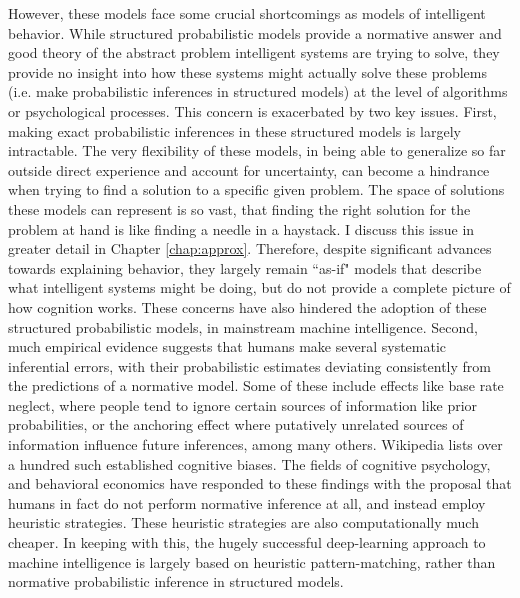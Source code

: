 However, these models face some crucial shortcomings as models of intelligent behavior. 
While structured probabilistic models provide a normative answer and good theory of the abstract problem intelligent systems are trying to solve, they provide no insight into how these systems might actually solve these problems (i.e. make probabilistic inferences in structured models) at the level of algorithms or psychological processes. %
This concern is exacerbated by two key issues. First, making exact probabilistic inferences in these structured models is largely intractable. The very flexibility of these models, in being able to generalize so far outside direct experience and account for uncertainty, can become a hindrance when trying to find a solution to a specific given problem. The space of solutions these models can represent is so vast, that finding the right solution for the problem at hand is like finding a needle in a haystack. I discuss this issue in greater detail in Chapter \ref{chap:approx}. Therefore, despite significant advances towards explaining behavior, they largely remain ``as-if" models that describe what intelligent systems might be doing, but do not provide a complete picture of how cognition works. These concerns have also hindered the adoption of these structured probabilistic models, in mainstream machine intelligence. Second, much empirical evidence suggests that humans make several systematic inferential errors, with their probabilistic estimates deviating consistently from the predictions of a normative model. Some of these include effects like base rate neglect\citep{koehler1996base}, where people tend to ignore certain sources of information like prior probabilities, or the anchoring effect\citep{tversky} where putatively unrelated sources of information influence future inferences, among many others. Wikipedia lists over a hundred such established cognitive biases. The fields of cognitive psychology\citep{phillips1966conservatism, gigerenzer1996reasoning}, and behavioral economics\citep{kahneman1973psychology} have responded to these findings with the proposal that humans in fact do not perform normative inference at all, and instead employ heuristic strategies. These heuristic strategies are also computationally much cheaper. In keeping with this, the hugely successful deep-learning approach to machine intelligence is largely based on heuristic pattern-matching\cite{marcus2018deep, lake18}, rather than normative probabilistic inference in structured models. 

